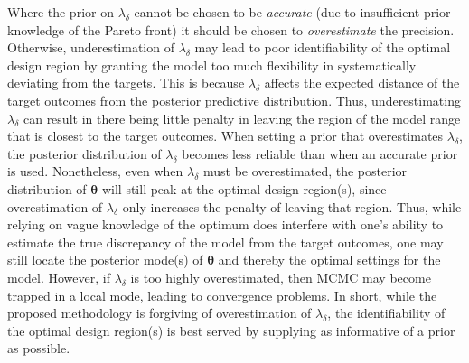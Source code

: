 \documentclass[12pt]{article}
\begin{document}
Where the prior on $\lambda_\delta$ cannot be chosen to be \emph{accurate} (due to insufficient prior knowledge of the Pareto front) it should be chosen to \emph{overestimate} the precision.
%
Otherwise, underestimation of $\lambda_\delta$ may lead to poor identifiability of the optimal design region by granting the model too much flexibility in systematically deviating from the targets.
%
This is because $\lambda_\delta$ affects the expected distance of the target outcomes from the posterior predictive distribution.
%
Thus, underestimating $\lambda_\delta$ can result in there being little penalty in leaving the region of the model range that is closest to the target outcomes.
%
When setting a prior that overestimates $\lambda_\delta$, the posterior distribution of $\lambda_\delta$ becomes less reliable than when an accurate prior is used.
%
Nonetheless, even when $\lambda_\delta$ must be overestimated, the posterior distribution of $\boldsymbol \theta$ will still peak at the optimal design region(s), since overestimation of $\lambda_\delta$ only increases the penalty of leaving that region.
%
Thus, while relying on vague knowledge of the optimum does interfere with one's ability to estimate the true discrepancy of the model from the target outcomes, one may still locate the posterior mode(s) of $\boldsymbol \theta$ and thereby the optimal settings for the model.
However, if $\lambda_\delta$ is too highly overestimated, then MCMC may become trapped in a local mode, leading to convergence problems. 
%
In short, while the proposed methodology is forgiving of overestimation of $\lambda_\delta$, the identifiability of the optimal design region(s) is best served by supplying as informative of a prior as possible. 
\end{document}
